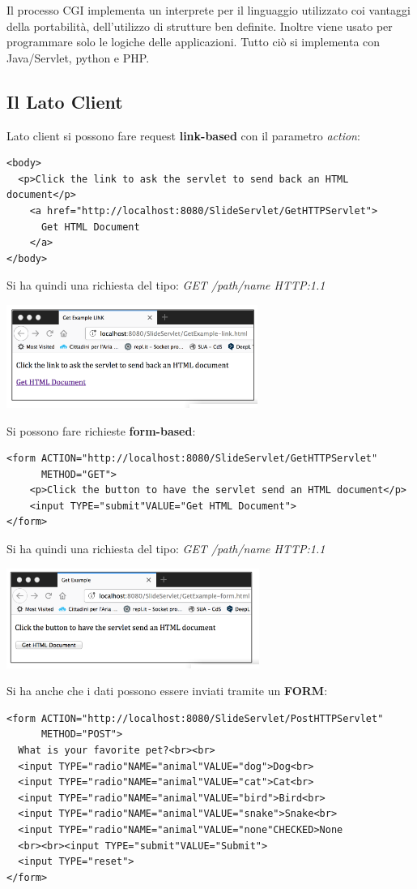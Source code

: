 \documentclass[a4paper,12pt, oneside]{book}
\begin{document}
Il processo CGI implementa un interprete per il linguaggio utilizzato coi vantaggi della portabilità, dell'utilizzo di strutture ben definite. Inoltre viene usato per programmare solo le logiche delle applicazioni. Tutto ciò si implementa con Java/Servlet, python e PHP. \\
\subsection{Il Lato Client}
Lato client si possono fare request \textbf{link-based} con il parametro \textit{action}:
\begin{verbatim}
<body>
  <p>Click the link to ask the servlet to send back an HTML document</p>
    <a href="http://localhost:8080/SlideServlet/GetHTTPServlet"> 
      Get HTML Document      
    </a>
</body>
\end{verbatim}
Si ha quindi una richiesta del tipo: \textit{GET /path/name HTTP:1.1}\\
\begin{center}
	\includegraphics[scale=0.7]{img/lb.png}
\end{center}
Si possono fare richieste \textbf{form-based}:
\begin{verbatim}
<form ACTION="http://localhost:8080/SlideServlet/GetHTTPServlet"
      METHOD="GET">
    <p>Click the button to have the servlet send an HTML document</p>
    <input TYPE="submit"VALUE="Get HTML Document">
</form>
\end{verbatim}
Si ha quindi una richiesta del tipo: \textit{GET /path/name HTTP:1.1}\\
\begin{center}
	\includegraphics[scale=0.7]{img/fb.png}
\end{center}
Si ha anche che i dati possono essere inviati tramite un \textbf{FORM}:
\begin{verbatim}
<form ACTION="http://localhost:8080/SlideServlet/PostHTTPServlet"
      METHOD="POST">  
  What is your favorite pet?<br><br>
  <input TYPE="radio"NAME="animal"VALUE="dog">Dog<br>
  <input TYPE="radio"NAME="animal"VALUE="cat">Cat<br>
  <input TYPE="radio"NAME="animal"VALUE="bird">Bird<br>
  <input TYPE="radio"NAME="animal"VALUE="snake">Snake<br>
  <input TYPE="radio"NAME="animal"VALUE="none"CHECKED>None
  <br><br><input TYPE="submit"VALUE="Submit">
  <input TYPE="reset">
</form>
\end{verbatim}
\end{document}
